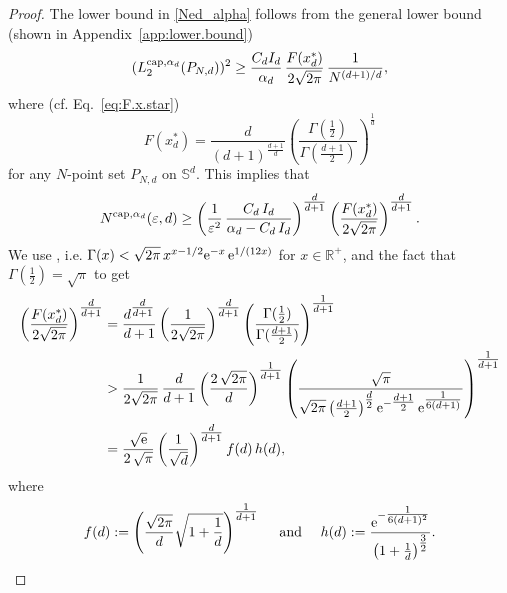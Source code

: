 \documentclass[12pt]{article}
\newcommand{\cp}{{\rm cap}}
\begin{document}
\begin{proof}
The lower bound in \eqref{Ned_alpha} follows from the general lower bound (shown in Appendix~\ref{app:lower.bound})
\begin{equation}\label{L2_lower_bound}
(L_2^{\cp,\alpha_d}(P_{N,d}))^2  \geq 
\frac{C_d I_d}{\alpha_d}  \, \frac{F(x_d^*)}{2 \sqrt{2\pi}} \, \frac{1}{N^{(d+1)/d}},
\end{equation}
where (cf. Eq.~\eqref{eq:F.x.star})
\begin{equation*}
F(x_d^*) = \frac{d}{(d+1)^{\tfrac{d+1}{d}}} \left(\frac{\Gamma(\frac{1}{2})}{\Gamma(\frac{d+1}{2})}\right)^{\tfrac{1}{d}} 
\end{equation*}
for any $N$-point set $P_{N,d}$ on $\mathbb{S}^d$. This implies that 
\begin{equation*}
N^{\cp,\alpha_d}(\varepsilon, d) 
\geq 
\left( \frac{1}{\varepsilon^2} \, \frac{C_d \, I_d}{\alpha_d - C_d \, I_d} \right)^{\tfrac{d}{d+1}} \left( \frac{F(x_d^*)}{2 \sqrt{2 \pi}} \right)^{\tfrac{d}{d+1}}.
\end{equation*}
We use \cite[Eq.~5.6.1]{NIST}, i.e. $\Gamma( x ) < \sqrt{2 \pi } \, x^{x-1/2} {\rm e}^{-x} \, {\rm e}^{1/(12x)}$ for $x \in \mathbb{R}^+$, and the fact that $\Gamma(\tfrac{1}{2})=\sqrt{\pi}$ to get
\begin{align*}
\left( \frac{F(x_d^*)}{2 \sqrt{2\pi}} \right)^{\tfrac{d}{d+1}}
&=
\frac{d^{\tfrac{d}{d+1}}}{d+1} \left( \frac{1}{2 \sqrt{2 \pi}} \right)^{\tfrac{d}{d+1}} \left(\frac{\Gamma(\frac{1}{2})}{\Gamma(\frac{d+1}{2})}\right)^{\tfrac{1}{d+1}}
\\
&>
\frac{1}{2 \sqrt{2 \pi}} \, \frac{d}{d+1} \left( \frac{2 \, \sqrt{2\pi}}{d} \right)^{\tfrac{1}{d+1}} \left(\frac{\sqrt{\pi}}{\sqrt{2\pi} \left( \frac{d+1}{2} \right)^{\tfrac{d}{2}} {\rm e}^{-\tfrac{d+1}{2}} \, {\rm e}^{\tfrac{1}{6(d+1)}}}\right)^{\tfrac{1}{d+1}}
\\
&= \frac{\sqrt{{\rm e}}}{2 \, \sqrt{\pi}} \left( \frac{1}{\sqrt{d}} \right)^{\tfrac{d}{d+1}}  f(d) \, h(d),
\end{align*}
where 
\begin{equation*}
f(d) := \left( \frac{\sqrt{2 \pi}}{d} \sqrt{1 + \frac{1}{d}}\right)^{\tfrac{1}{d+1}} \quad \mbox{ and } \quad h( d ) := \frac{{\rm e}^{-\tfrac{1}{6(d+1)^2}}}{\left( 1 + \frac{1}{d} \right)^{\tfrac{3}{2}}}.
\end{equation*}

\end{proof}
\end{document}
